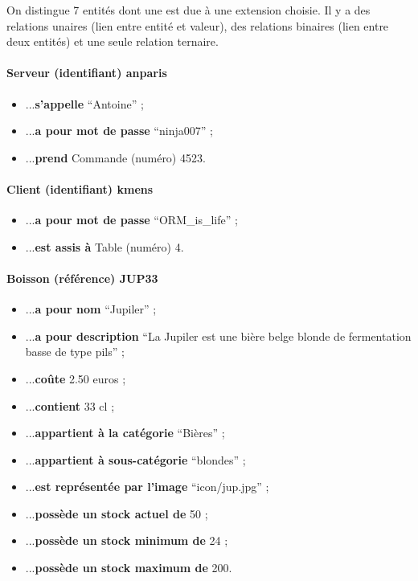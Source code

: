 
On distingue 7 entités dont une est due à une
extension choisie. Il y a des relations unaires
(lien entre entité et valeur), des relations binaires
(lien entre deux entités) et une seule relation ternaire.

\paragraph{Serveur (identifiant) anparis}
\begin{itemize}
	\item ...\textbf{s'appelle} ``Antoine'' ;
	\item ...\textbf{a pour mot de passe} ``ninja007'' ;
	\item ...\textbf{prend} Commande (numéro) 4523.
\end{itemize}

\paragraph{Client (identifiant) kmens}
\begin{itemize}
	\item ...\textbf{a pour mot de passe} ``ORM\_is\_life'' ;
	\item ...\textbf{est assis à} Table (numéro) 4.
\end{itemize}

\paragraph{Boisson (référence) JUP33}
\begin{itemize}		
	\item ...\textbf{a pour nom} ``Jupiler'' ;
	\item ...\textbf{a pour description} ``La Jupiler est une bière belge blonde
	de fermentation basse de type pils'' ;
	\item ...\textbf{coûte} 2.50 euros ;
	\item ...\textbf{contient} 33 cl ;
	\item ...\textbf{appartient à la catégorie} ``Bières'' ;
	\item ...\textbf{appartient à sous-catégorie} ``blondes'' ;
	\item ...\textbf{est représentée par l'image} ``icon/jup.jpg'' ;
	\item ...\textbf{possède un stock actuel de} 50 ;
	\item ...\textbf{possède un stock minimum de}  24 ;
	\item ...\textbf{possède un stock maximum de} 200.
\end{itemize}

